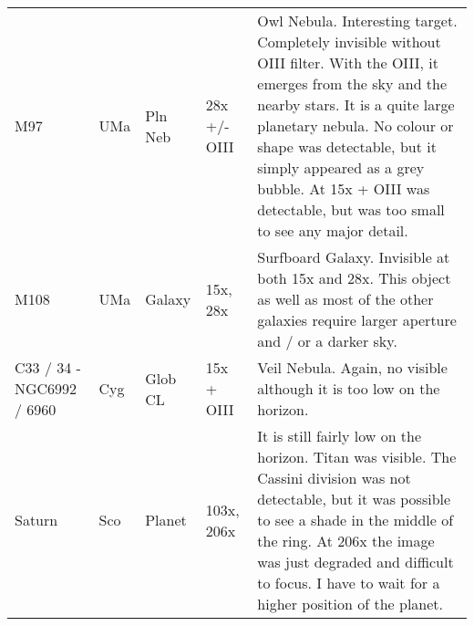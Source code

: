 \begin{longtable}{ p{0.7in}  p{0.3in}  p{0.6in}  p{0.9in}  p{5.8in} }
M97 & UMa & Pln Neb & 28x +/- OIII & Owl Nebula. Interesting target. Completely invisible without OIII filter. With the OIII, it emerges from the sky and the nearby stars. It is a quite large planetary nebula. No colour or shape was detectable, but it simply appeared as a grey bubble. At 15x + OIII was detectable, but was too small to see any major detail. \\ 
M108 & UMa & Galaxy & 15x, 28x & Surfboard Galaxy. Invisible at both 15x and 28x. This object as well as most of the other galaxies require larger aperture and / or a darker sky. \\ 
C33 / 34 - NGC6992 / 6960 & Cyg & Glob CL & 15x + OIII & Veil Nebula. Again, no visible although it is too low on the horizon. \\ 
Saturn & Sco & Planet & 103x, 206x & It is still fairly low on the horizon. Titan was visible. The Cassini division was not detectable, but it was possible to see a shade in the middle of the ring. At 206x the image was just degraded and difficult to focus. I have to wait for a higher position of the planet. \\ 
\hline 
\end{longtable} 
